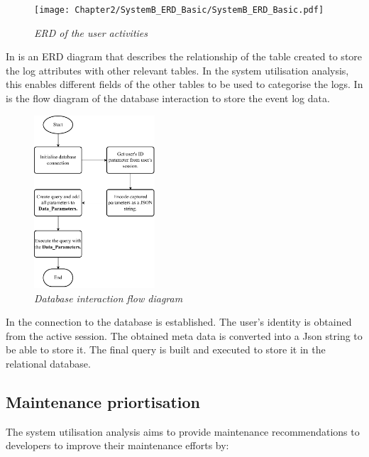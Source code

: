 \begin{figure}[!htb] %
	\centering %
	\texttt{[image: Chapter2/SystemB\_ERD\_Basic/SystemB\_ERD\_Basic.pdf]}
	\caption[ERD of user activities]
	{\textit{ERD of the user activities}}\label{fig:ch2_erdOfEventLogs}
\end{figure}

In  is an ERD diagram that describes the relationship of the table created to store the log attributes with other relevant tables. In the system utilisation analysis, this enables different fields of the other tables to be used to categorise the logs. In  is the flow diagram of the database interaction to store the event log data.

\clearpage

\begin{figure}[!htb]
	\centering
	\includegraphics[width=0.4\textwidth]{img/Chapter2/sql_interaction/sql_interaction.pdf}
	\caption[Database interaction flow diagram]
	{\textit{Database interaction flow diagram}}\label{fig:ch2_database}
\end{figure}

In  the connection to the database is established. The user's identity is obtained from the active session. The obtained meta data is converted into a Json string to be able to store it. The final query is built and executed to store it in the relational database.

\subsection{Maintenance priortisation}
The system utilisation analysis aims to provide maintenance recommendations to developers to improve their maintenance efforts by:

